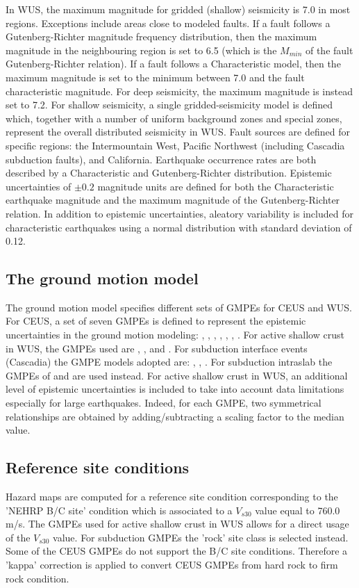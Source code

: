In WUS, the maximum magnitude for gridded (shallow) seismicity is 7.0 in most regions. Exceptions include areas close to modeled faults. If a fault follows a Gutenberg-Richter magnitude frequency distribution, then the maximum magnitude in the neighbouring region is set to 6.5 (which is the $M_{min}$ of the fault Gutenberg-Richter relation). If a fault follows a Characteristic model, then the maximum magnitude is set to the minimum between 7.0 and the fault characteristic magnitude. For deep seismicity, the maximum magnitude is instead set to 7.2. For shallow seismicity, a single gridded-seismicity model is defined which, together with a number of uniform background zones and special zones, represent the overall distributed seismicity in WUS. Fault sources are defined for specific regions: the Intermountain West, Pacific Northwest (including Cascadia subduction faults), and California. Earthquake occurrence rates are both described by a Characteristic and Gutenberg-Richter distribution. Epistemic uncertainties of $\pm 0.2$ magnitude units are defined for both the Characteristic earthquake magnitude and the maximum magnitude of the Gutenberg-Richter relation. In addition to epistemic uncertainties, aleatory variability is included for characteristic earthquakes using a normal distribution with standard deviation of 0.12.

\subsection{The ground motion model}
The ground motion model specifies different sets of GMPEs for CEUS and WUS. For CEUS, a set of seven GMPEs is defined to represent the epistemic uncertainties in the ground motion modeling: \citet{frankel1996}, \citet{somerville2001}, \citet{campbell2003SCR}, \citet{toro1997}, \citet{atkinson2006}, \citet{tavakoli2005}, \citet{silva2002}. For active shallow crust in WUS, the GMPEs used are \citet{boore2008}, \citet{campbell2008}, and \citet{chiou2008}. For subduction interface events (Cascadia) the GMPE models adopted are: \citet{y1997}, \citet{ab2003}, \citet{zhao2006}. For subduction intraslab the GMPEs of \citet{geomatrix1993} and \citet{ab2003} are used instead. For active shallow crust in WUS, an additional level of epistemic uncertainties is included to take into account data limitations especially for large earthquakes. Indeed, for each GMPE, two symmetrical relationships are obtained by adding/subtracting a scaling factor to the median value.

\subsection{Reference site conditions}
Hazard maps are computed for a reference site condition corresponding to the 'NEHRP B/C site' condition which is associated to a $V_{s30}$ value equal to 760.0 m/s. The GMPEs used for active shallow crust in WUS allows for a direct usage of the $V_{s30}$ value. For subduction GMPEs the 'rock' site class is selected instead. Some of the CEUS GMPEs do not support the B/C site conditions. Therefore a 'kappa' correction is applied to convert CEUS GMPEs from hard rock to firm rock condition.

